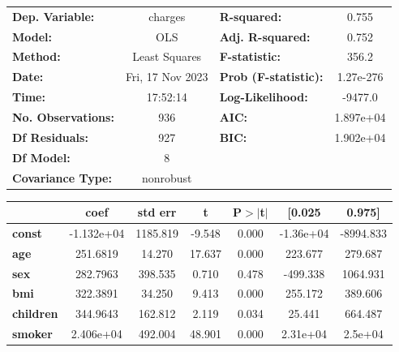 \begin{center}
\begin{tabular}{lclc}
\toprule
\textbf{Dep. Variable:}    &     charges      & \textbf{  R-squared:         } &     0.755   \\
\textbf{Model:}            &       OLS        & \textbf{  Adj. R-squared:    } &     0.752   \\
\textbf{Method:}           &  Least Squares   & \textbf{  F-statistic:       } &     356.2   \\
\textbf{Date:}             & Fri, 17 Nov 2023 & \textbf{  Prob (F-statistic):} & 1.27e-276   \\
\textbf{Time:}             &     17:52:14     & \textbf{  Log-Likelihood:    } &   -9477.0   \\
\textbf{No. Observations:} &         936      & \textbf{  AIC:               } & 1.897e+04   \\
\textbf{Df Residuals:}     &         927      & \textbf{  BIC:               } & 1.902e+04   \\
\textbf{Df Model:}         &           8      & \textbf{                     } &             \\
\textbf{Covariance Type:}  &    nonrobust     & \textbf{                     } &             \\
\bottomrule
\end{tabular}
\begin{tabular}{lcccccc}
                           & \textbf{coef} & \textbf{std err} & \textbf{t} & \textbf{P$> |$t$|$} & \textbf{[0.025} & \textbf{0.975]}  \\
\midrule
\textbf{const}             &   -1.132e+04  &     1185.819     &    -9.548  &         0.000        &    -1.36e+04    &    -8994.833     \\
\textbf{age}               &     251.6819  &       14.270     &    17.637  &         0.000        &      223.677    &      279.687     \\
\textbf{sex}               &     282.7963  &      398.535     &     0.710  &         0.478        &     -499.338    &     1064.931     \\
\textbf{bmi}               &     322.3891  &       34.250     &     9.413  &         0.000        &      255.172    &      389.606     \\
\textbf{children}          &     344.9643  &      162.812     &     2.119  &         0.034        &       25.441    &      664.487     \\
\textbf{smoker}            &    2.406e+04  &      492.004     &    48.901  &         0.000        &     2.31e+04    &      2.5e+04     \\

\end{tabular}
\end{center}
